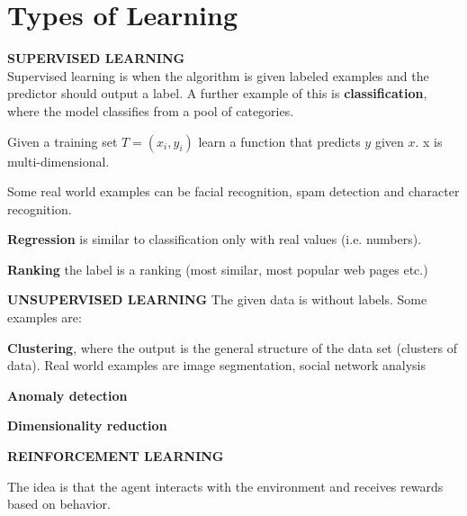 \documentclass[oneside]{book}
\theoremstyle{definition}
\begin{document}
\section{Types of Learning}
\textbf{SUPERVISED LEARNING}\\
Supervised learning is when the algorithm is given labeled examples and the predictor should output a label. A further example of this is \textbf{classification}, where the model classifies from a pool of categories. 

Given a training set $T = {(x_i, y_i)}$ learn a function that predicts $y$ given $x$. x is multi-dimensional.

Some real world examples can be facial recognition, spam detection and character recognition. 

\textbf{Regression} is similar to classification only with real values (i.e. numbers).

\textbf{Ranking} the label is a ranking (most similar, most popular web pages etc.)


\textbf{UNSUPERVISED LEARNING}
The given data is without labels. 
Some examples are: 

\textbf{Clustering}, where the output is the general structure of the data set (clusters of data). Real world examples are image segmentation, social network analysis 

\textbf{Anomaly detection}

\textbf{Dimensionality reduction} 

\textbf{REINFORCEMENT LEARNING}

The idea is that the agent interacts with the environment and receives rewards based on behavior. 
\end{document}

